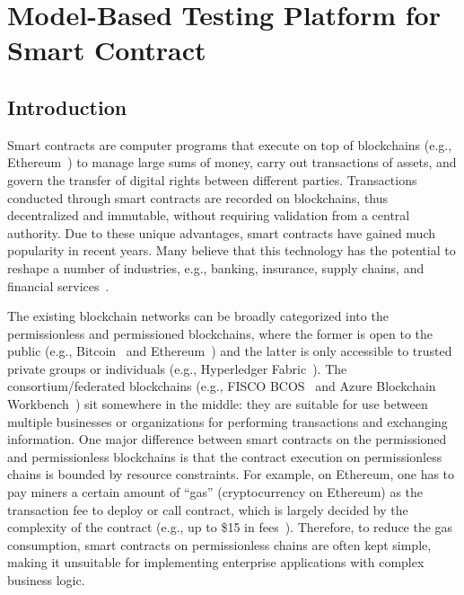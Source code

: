 
\chapter{Model-Based Testing Platform for Smart Contract} %
\label{ch:modcon} %



\section{Introduction}
\label{sec:intro}

Smart contracts are computer programs that execute on top of blockchains (e.g.,
Ethereum~\cite{Ethereum}) to manage large sums of money, carry out transactions of assets, and
govern the transfer of digital rights between different parties.
Transactions conducted through smart contracts are recorded on blockchains, thus decentralized and
immutable, without requiring validation from a central authority.
Due to these unique advantages, smart contracts have gained much popularity in recent years.
Many believe that this technology has the potential to reshape a number of industries,
e.g., banking, insurance, supply chains, and financial services~\cite{iansiti2017truth}.

The existing blockchain networks can be broadly categorized into the permissionless and
permissioned blockchains, where the former is open to the public (e.g.,
Bitcoin~\cite{nakamoto2008bitcoin} and Ethereum~\cite{Ethereum}) and the latter is only accessible
to trusted private groups or individuals (e.g., Hyperledger Fabric~\cite{hyperledger-fabric}).
The consortium/federated blockchains (e.g., FISCO BCOS~\cite{fisco} and Azure Blockchain
Workbench~\cite{azure-workbench}) sit somewhere in the middle: they are suitable for use between
multiple businesses or organizations for performing  transactions and exchanging information.
One major difference between smart contracts on the permissioned and permissionless blockchains is that the
contract execution on permissionless chains is bounded by resource constraints.
For example, on Ethereum, one has to pay miners a certain amount of ``gas'' (cryptocurrency on Ethereum) as the transaction fee to deploy or call contract, which is largely decided by the complexity of the contract (e.g., up to \$15 in fees~\cite{gas-fee}).
Therefore, to reduce the gas consumption, smart contracts on permissionless chains are often kept simple, making it
unsuitable for implementing enterprise applications with complex business logic.

